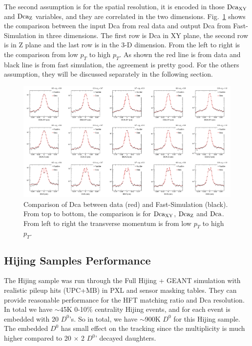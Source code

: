 The second assumption is for the spatial resolution, it is encoded in those $\textup{Dca}_{\textup{XY}}$ and $\textup{Dca}_{\textup{Z}}$ variables, and they are correlated in the two dimensions. Fig.~\ref{assumption2} shows the comparison between the input Dca from real data and output Dca from Fast-Simulation in three dimensions. The first row is Dca in XY plane, the second row is in Z plane and the last row is in the 3-D dimension. From the left to right is the comparison from low $p_{T}$ to high $p_{T}$. As shown the red line is from data and black line is from fast simulation, the agreement is pretty good.
For the others assumption, they will be discussed separately in the following section.

\begin{figure}[htbp]
\centering
\includegraphics[keepaspectratio,width=1.0\textwidth]{figure/Run14_D0HFT/assumption2.png}
\caption{Comparison of Dca between data (red) and Fast-Simulation (black). From top to bottom, the comparison is for $\textup{Dca}_{\textup{XY}}$, $\textup{Dca}_{\textup{Z}}$ and $\textup{Dca}$. From left to right the transverse momentum is from low $p_T$ to high $p_T$.}
\label{assumption2}
\end{figure}

\subsection{Hijing Samples Performance}
\label{hijingsample}
The Hijing sample was run through the Full Hijing + GEANT simulation with realistic pileup hits (UPC+MB) in PXL and sensor masking tables. They can provide reasonable performance for the HFT matching ratio and Dca resolution. 
In total we have $\sim$45K 0-10\% centrality Hijing events, and for each event is embedded with 20 $D^0$'s. So in total, we have $\sim$900K $D^0$ for this Hijing sample. The embedded $D^0$ has small effect on the tracking since the multiplicity is much higher compared to 20 $\times$ 2 $D^0$' decayed daughters.

